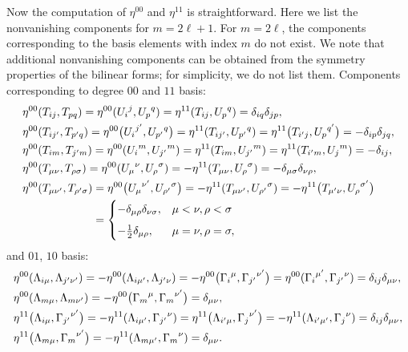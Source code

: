 \documentclass[10pt,a4paper]{amsart}
\numberwithin{equation}{section}
\theoremstyle{definition}
\begin{document}
Now the computation of $\eta^{00}$ and $\eta^{11}$ is straightforward. Here we list the nonvanishing components for $m = 2\ell + 1$. For $m = 2\ell$, the components corresponding to the basis elements with index $m$ do not exist. We note that additional nonvanishing components can be obtained from the symmetry properties of the bilinear forms; for simplicity, we do not list them.
Components corresponding to degree $00$ and $11$ basis:
\begin{align}
&	\eta^{00}(T_{ij},T_{pq})= \eta^{00}({U_i}^j, {U_p}^q) = \eta^{11}(T_{ij},{U_p}^q) = \delta_{iq} \delta_{jp},
	\notag\\
&	\eta^{00}(T_{ij'}, T_{p'q})= \eta^{00}\bigl({U_i}^{j'}, {U_{p'}}^{q}\bigr) = \eta^{11}(T_{ij'},{U_{p'}}^q) = \eta^{11}\bigl(T_{i'j},{U_p}^{q'}\bigr) = -\delta_{ip} \delta_{jq},
	\notag \\
	&\eta^{00}(T_{im}, T_{j'm})= \eta^{00}({U_i}^m,{U_{j'}}^m) = \eta^{11}(T_{im},{U_{j'}}^m) = \eta^{11}(T_{i'm}, {U_j}^m) = -\delta_{ij},
	\notag \\
	&\eta^{00}(T_{\mu\nu}, T_{\rho\sigma})= \eta^{00}({U_{\mu}}^{\nu},{U_{\rho}}^{\sigma}) = -\eta^{11}(T_{\mu\nu},{U_{\rho}}^{\sigma})= -\delta_{\mu\sigma} \delta_{\nu\rho},
	\notag\\
	&\eta^{00}(T_{\mu\nu'}, T_{\rho'\sigma})= \eta^{00}\bigl({U_{\mu}}^{\nu'},{U_{\rho'}}^{\sigma}\bigr) = -\eta^{11}(T_{\mu\nu'},{U_{\rho'}}^{\sigma}) =
	-\eta^{11}\bigl(T_{\mu'\nu},{U_{\rho}}^{\sigma'}\bigr)
	\notag\\
	&\hphantom{\eta^{00}(T_{\mu\nu'}, T_{\rho'\sigma})}{}
=
	\begin{cases}
		-\delta_{\mu\rho} \delta_{\nu\sigma}, & \mu < \nu, \rho < \sigma
		\\[5pt]
		-\frac{1}{2} \delta_{\mu\rho}, & \mu = \nu, \rho=\sigma,
	\end{cases}
	\label{BFosp1}
\end{align}
and $01$, $10$ basis:
\begin{align}
&	\eta^{00}(\Lambda_{i\mu}, \Lambda_{j'\nu'})= -\eta^{00}(\Lambda_{i\mu'}, \Lambda_{j'\nu}) = -\eta^{00}\bigl({\Gamma_i}^{\mu}, {\Gamma_{j'}}^{\nu'}\bigr) = \eta^{00}({\Gamma_i}^{\mu'}, {\Gamma_{j'}}^{\nu}) = \delta_{ij}\delta_{\mu\nu},
	\notag\\
&	\eta^{00}(\Lambda_{m\mu}, \Lambda_{m\nu'})= -\eta^{00}\bigl({\Gamma_m}^{\mu}, {\Gamma_m}^{\nu'}\bigr) = \delta_{\mu\nu},
	\notag\\
&	\eta^{11}\bigl(\Lambda_{i\mu},{\Gamma_{j'}}^{\nu'}\bigr)= -\eta^{11}(\Lambda_{i\mu'},{\Gamma_{j'}}^{\nu}) = \eta^{11}\bigl(\Lambda_{i'\mu},{\Gamma_{j}}^{\nu'}\bigr) = -\eta^{11}(\Lambda_{i'\mu'},{\Gamma_j}^{\nu}) = \delta_{ij} \delta_{\mu\nu},
	\notag\\
	&\eta^{11}\bigl(\Lambda_{m\mu},{\Gamma_m}^{\nu'}\bigr)=-\eta^{11}(\Lambda_{m\mu'},{\Gamma_m}^{\nu}) = \delta_{\mu\nu}.
	\label{BFosp2}
\end{align}
\end{document}
